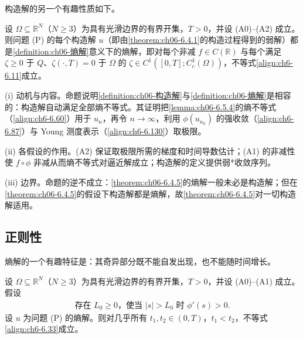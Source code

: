 \documentclass[../../main.tex]{subfiles}%
\begin{document}
构造解的另一个有趣性质如下。

\begin{proposition}\label{proposition:ch06-6.4.4}
设 $\Omega\subseteq\mathbb{R}^N$（$N\geqslant3$）为具有光滑边界的有界开集，$T>0$，并设 (A0)--(A2) 成立。则问题 (P) 的每个构造解 $u$（即由\cref{theorem:ch06-6.4.1}的构造过程得到的弱解）都是\cref{definition:ch06-熵解}意义下的熵解，即对每个非减 $f\in C(\mathbb{R})$ 与每个满足 $\zeta\geqslant0$ 于 $Q$、$\zeta(\cdot,T)=0$ 于 $\Omega$ 的 $\zeta\in C^1([0,T];C^1_c(\Omega))$，不等式\eqref{align:ch6-6.11}成立。
\end{proposition}

\begin{remark}\label{remark:ch06-构造熵}
(i) 动机与内容。命题说明\cref{definition:ch06-构造解}与\cref{definition:ch06-熵解}是相容的：构造解自动满足全部熵不等式。其证明把\cref{lemma:ch06-6.5.4}的熵不等式（\eqref{align:ch6-6.60}）用于 $u_n$，再令 $n\to\infty$，利用 $\phi(u_{n_k})$ 的强收敛（\eqref{align:ch6-6.87}）与 Young 测度表示（\eqref{align:ch6-6.130}）取极限。

(ii) 各假设的作用。(A2) 保证取极限所需的梯度和时间导数估计；(A1) 的非减性使 $f\circ\phi$ 非减从而熵不等式对逼近解成立；构造解的定义提供弱*收敛序列。

(iii) 边界。命题的逆不成立：\cref{theorem:ch06-6.4.5}的熵解一般未必是构造解；但在\cref{theorem:ch06-6.4.5}的假设下构造解都是熵解，故\cref{theorem:ch06-6.4.5}对一切构造解适用。
\end{remark}

\subsection{正则性}\label{subsection:ch06-正则性}

熵解的一个有趣特征是：其奇异部分既不能自发出现，也不能随时间增长。
\begin{theorem}\label{theorem:ch06-6.4.5}
设 $\Omega\subseteq\mathbb{R}^N$（$N\geqslant3$）为具有光滑边界的有界开集，$T>0$，并设 (A0)--(A1) 成立。假设
\begin{align}
\text{存在 }L_0\geqslant0\text{，使当 }|s|>L_0\text{ 时 }\phi'(s)>0. \label{align:ch6-6.34}
\end{align}
设 $u$ 为问题 (P) 的熵解。则对几乎所有 $t_1,t_2\in(0,T)$，$t_1<t_2$，不等式\eqref{align:ch6-6.33}成立。
\end{theorem}
\end{document}
